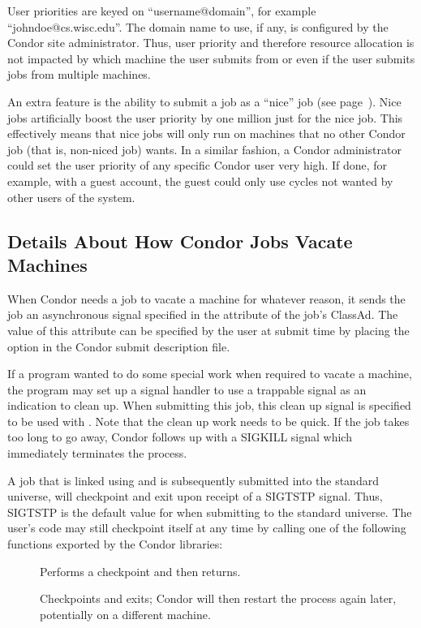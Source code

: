 User priorities are keyed on ``username@domain'', for example
``johndoe@cs.wisc.edu''. The domain name to use, if any, is configured by
the Condor site administrator.  Thus, user priority and therefore resource
allocation is not impacted by which machine the user submits from or
even if the user submits jobs from multiple machines.

An extra feature is the ability to submit a job as
a ``nice'' job (see page~\pageref{man-condor-submit-nice}).
Nice jobs artificially boost the user priority 
by one million just for the nice job.
This effectively means that nice jobs will only run on
machines that no other Condor job (that is, non-niced job) wants.
In a similar fashion, a Condor administrator could set
the user priority of any specific Condor user very high.
If done, for example, with a guest account,
the guest could only use cycles not wanted by other users of the system.


\subsection{\label{sec:Vacate-Explained}
Details About How Condor Jobs Vacate Machines}

When Condor needs a job to vacate a machine for whatever reason, it
sends the job an asynchronous signal specified in the 
attribute of the job's ClassAd.
The value of this attribute can be specified by
the user at submit time by placing the  option in the
Condor submit description file.  

If a program wanted to do some special work when required
to vacate a machine, the program may set up a
signal handler to use a trappable signal as an indication
to clean up.
When submitting this job, this clean up signal is specified to be used with
.
Note that the clean up work needs to be quick.
If the job takes too long to go away, Condor
follows up with a SIGKILL signal which immediately terminates the
process.

A job that is linked using 
and is subsequently submitted into the standard universe, 
will checkpoint and exit upon receipt of a SIGTSTP signal.
Thus, SIGTSTP is
the default value for  when submitting to the standard
universe.
The user's code may still checkpoint itself at any time
by calling one of the following functions exported by the Condor libraries:
\begin{description}
\item[] Performs a checkpoint and then returns.
\item[] Checkpoints and exits; Condor will then
restart the process again later, potentially on a different machine.
\end{description}

